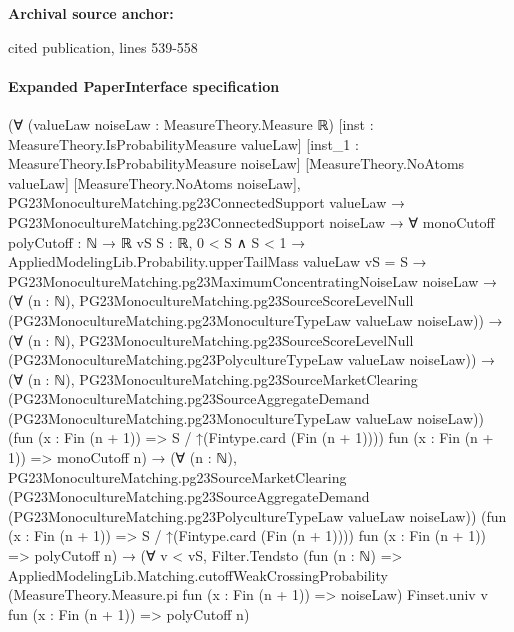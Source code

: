 \documentclass[10pt]{article}
\begin{document}
\textbf{Archival source anchor:} {\footnotesize\raggedright cited publication, lines 539-\allowbreak{}558\par}
\paragraph{Expanded PaperInterface specification}
\begin{ReviewVerbatim}
(∀ (valueLaw noiseLaw : MeasureTheory.Measure ℝ) [inst : MeasureTheory.IsProbabilityMeasure valueLaw]
    [inst_1 : MeasureTheory.IsProbabilityMeasure noiseLaw] [MeasureTheory.NoAtoms valueLaw]
    [MeasureTheory.NoAtoms noiseLaw],
    PG23MonocultureMatching.pg23ConnectedSupport valueLaw →
      PG23MonocultureMatching.pg23ConnectedSupport noiseLaw →
        ∀ {monoCutoff polyCutoff : ℕ → ℝ} {vS S : ℝ},
          0 < S ∧ S < 1 →
            AppliedModelingLib.Probability.upperTailMass valueLaw vS = S →
              PG23MonocultureMatching.pg23MaximumConcentratingNoiseLaw noiseLaw →
                (∀ (n : ℕ),
                    PG23MonocultureMatching.pg23SourceScoreLevelNull
                      (PG23MonocultureMatching.pg23MonocultureTypeLaw valueLaw noiseLaw)) →
                  (∀ (n : ℕ),
                      PG23MonocultureMatching.pg23SourceScoreLevelNull
                        (PG23MonocultureMatching.pg23PolycultureTypeLaw valueLaw noiseLaw)) →
                    (∀ (n : ℕ),
                        PG23MonocultureMatching.pg23SourceMarketClearing
                          (PG23MonocultureMatching.pg23SourceAggregateDemand
                            (PG23MonocultureMatching.pg23MonocultureTypeLaw valueLaw noiseLaw))
                          (fun (x : Fin (n + 1)) => S / ↑(Fintype.card (Fin (n + 1)))) fun (x : Fin (n + 1)) =>
                          monoCutoff n) →
                      (∀ (n : ℕ),
                          PG23MonocultureMatching.pg23SourceMarketClearing
                            (PG23MonocultureMatching.pg23SourceAggregateDemand
                              (PG23MonocultureMatching.pg23PolycultureTypeLaw valueLaw noiseLaw))
                            (fun (x : Fin (n + 1)) => S / ↑(Fintype.card (Fin (n + 1)))) fun (x : Fin (n + 1)) =>
                            polyCutoff n) →
                        (∀ v < vS,
                            Filter.Tendsto
                              (fun (n : ℕ) =>
                                AppliedModelingLib.Matching.cutoffWeakCrossingProbability
                                  (MeasureTheory.Measure.pi fun (x : Fin (n + 1)) => noiseLaw) Finset.univ v
                                  fun (x : Fin (n + 1)) => polyCutoff n)

\end{ReviewVerbatim}
\end{document}
